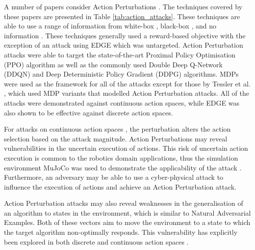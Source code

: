 \documentclass[conference,compsoc]{IEEEtran}
\begin{document}
A number of papers consider Action Perturbations \cite{lee_query-based_2021, lee_spatiotemporally_2020, tessler_action_2019, guo_edge_2021, weng_toward_2020}. The techniques covered by these papers are presented in Table \ref{tab:action_attacks}. These techniques are able to use a range of information from white-box \cite{lee_spatiotemporally_2020, weng_toward_2020}, black-box \cite{lee_query-based_2021, guo_edge_2021}, and no information \cite{tessler_action_2019}. These techniques generally used a reward-based objective \cite{lee_spatiotemporally_2020,lee_query-based_2021,tessler_action_2019, weng_toward_2020} with the exception of an attack using EDGE \cite{guo_edge_2021} which was untargeted. Action Perturbation attacks were able to target the state-of-the-art Proximal Policy Optimisation (PPO) algorithm \cite{schulman_proximal_2017} as well as the commonly used Double Deep Q-Network (DDQN) \cite{van_hasselt_deep_2018} and Deep Deterministic Policy Gradient (DDPG) \cite{lillicrap_continuous_2019} algorithms. MDPs were used as the framework for all of the attacks except for those by Tessler et al. \cite{tessler_action_2019}, which used MDP variants that modelled Action Perturbation attacks. All of the attacks were demonstrated against continuous action spaces, while EDGE was also shown to be effective against discrete action spaces.

For attacks on continuous action spaces \cite{lee_query-based_2021, lee_spatiotemporally_2020, tessler_action_2019, guo_edge_2021, weng_toward_2020}, the perturbation alters the action selection based on the attack magnitude. Action Perturbations may reveal vulnerabilities in the uncertain execution of actions. This risk of uncertain action execution is common to the robotics domain applications, thus the simulation environment MuJoCo \cite{todorov_mujoco_2012} was used to demonstrate the applicability of the attack \cite{lee_spatiotemporally_2020, tessler_action_2019, guo_edge_2021, weng_toward_2020}. Furthermore, an adversary may be able to use a cyber-physical attack to influence the execution of actions and achieve an Action Perturbation attack.

Action Perturbation attacks may also reveal weaknesses in the generalisation of an algorithm to states in the environment, which is similar to Natural Adversarial Examples. Both of these vectors aim to move the environment to a state to which the target algorithm non-optimally responds. This vulnerability has explicitly been explored in both discrete \cite{guo_edge_2021} and continuous action spaces \cite{tessler_action_2019}. 
\end{document}
